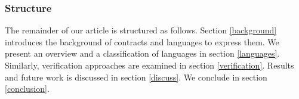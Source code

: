 \subsubsection{Structure} The remainder of our article is structured as follows. Section \ref{background} introduces the background of contracts and languages to express them. We present an overview and a classification of languages in section \ref{languages}. Similarly, verification approaches are examined in section \ref{verification}. Results and future work is discussed in section \ref{discuss}. We conclude in section \ref{conclusion}.